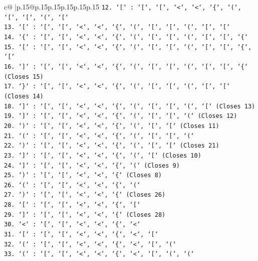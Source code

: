 \documentclass{article}
\begin{document}
{\begin{supertabular}{c@{$\;$}|p{.15\linewidth}@{}p{.15\linewidth}p{.15\linewidth}p{.15\linewidth}p{.15\linewidth}p{.15\linewidth}}
{{{\texttt{12. `{[}` : `{[}`, `{[}`, `<`, `<`, `\{`, `(`, `{[}`, `{[}`, `(`, `{[}`} \\
\texttt{13. `{[}` : `{[}`, `{[}`, `<`, `<`, `\{`, `(`, `{[}`, `{[}`, `(`, `{[}`, `{[}`} \\
\texttt{14. `\{` : `{[}`, `{[}`, `<`, `<`, `\{`, `(`, `{[}`, `{[}`, `(`, `{[}`, `{[}`, `\{`} \\
\texttt{15. `{[}` : `{[}`, `{[}`, `<`, `<`, `\{`, `(`, `{[}`, `{[}`, `(`, `{[}`, `{[}`, `\{`, `{[}`} \\
\texttt{16. `{]}` : `{[}`, `{[}`, `<`, `<`, `\{`, `(`, `{[}`, `{[}`, `(`, `{[}`, `{[}`, `\{` (Closes 15)} \\
\texttt{17. `\}` : `{[}`, `{[}`, `<`, `<`, `\{`, `(`, `{[}`, `{[}`, `(`, `{[}`, `{[}` (Closes 14)} \\
\texttt{18. `{]}` : `{[}`, `{[}`, `<`, `<`, `\{`, `(`, `{[}`, `{[}`, `(`, `{[}` (Closes 13)} \\
\texttt{19. `{]}` : `{[}`, `{[}`, `<`, `<`, `\{`, `(`, `{[}`, `{[}`, `(` (Closes 12)} \\
\texttt{20. `)` : `{[}`, `{[}`, `<`, `<`, `\{`, `(`, `{[}`, `{[}` (Closes 11)} \\
\texttt{21. `(` : `{[}`, `{[}`, `<`, `<`, `\{`, `(`, `{[}`, `{[}`, `(`} \\
\texttt{22. `)` : `{[}`, `{[}`, `<`, `<`, `\{`, `(`, `{[}`, `{[}` (Closes 21)} \\
\texttt{23. `{]}` : `{[}`, `{[}`, `<`, `<`, `\{`, `(`, `{[}` (Closes 10)} \\
\texttt{24. `{]}` : `{[}`, `{[}`, `<`, `<`, `\{`, `(` (Closes 9)} \\
\texttt{25. `)` : `{[}`, `{[}`, `<`, `<`, `\{` (Closes 8)} \\
\texttt{26. `(` : `{[}`, `{[}`, `<`, `<`, `\{`, `(`} \\
\texttt{27. `)` : `{[}`, `{[}`, `<`, `<`, `\{` (Closes 26)} \\
\texttt{28. `{[}` : `{[}`, `{[}`, `<`, `<`, `\{`, `{[}`} \\
\texttt{29. `{]}` : `{[}`, `{[}`, `<`, `<`, `\{` (Closes 28)} \\
\texttt{30. `<` : `{[}`, `{[}`, `<`, `<`, `\{`, `<`} \\
\texttt{31. `{[}` : `{[}`, `{[}`, `<`, `<`, `\{`, `<`, `{[}`} \\
\texttt{32. `(` : `{[}`, `{[}`, `<`, `<`, `\{`, `<`, `{[}`, `(`} \\
\texttt{33. `(` : `{[}`, `{[}`, `<`, `<`, `\{`, `<`, `{[}`, `(`, `(`} \\
}}}
\end{supertabular}}
\end{document}
